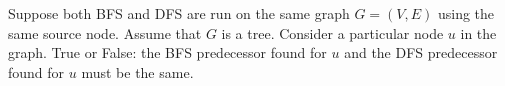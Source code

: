 \begin{prob}
    Suppose both BFS and DFS are run on the same graph $G = (V, E)$ using the
    same source node. Assume that $G$ is a tree. Consider a particular node $u$
    in the graph. True or False: the BFS predecessor found for $u$ and the DFS
    predecessor found for $u$ must be the same.

    \Tf{}

\end{prob}
